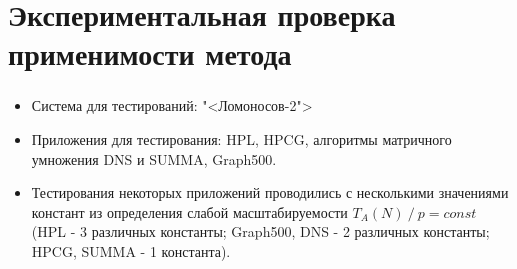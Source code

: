 \documentclass[unicode, t, 11pt]{beamer}%
\begin{document}
	\section{Экспериментальная проверка применимости метода}
		\begin{frame}
			\frametitle{\insertsection}
			\begin{itemize}[label = \(\bullet\)]

			\item Система для тестирований: "<Ломоносов-2">
			\item Приложения для тестирования: HPL, HPCG, алгоритмы матричного умножения DNS и SUMMA, Graph500.

			\item Тестирования некоторых приложений проводились с несколькими значениями констант из определения слабой масштабируемости \(T_A(N)\:/\:p = const\) (HPL - 3 различных константы; Graph500, DNS - 2 различных константы; HPCG, SUMMA - 1 константа).

			\end{itemize}
		\end{frame}

\end{document}
